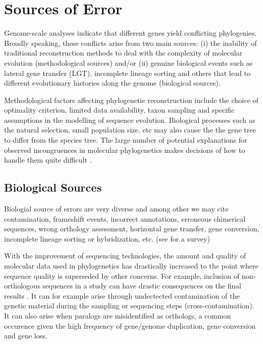 \section{Sources of Error} \label{sec:error-sources}

%
Genome-scale analyses indicate that different genes yield conflicting phylogenies. Broadly speaking, these conflicts arise from two main sources: (i) the inability of traditional reconstruction methods to deal with the complexity of molecular evolution (methodological sources) and/or (ii) genuine biological events such as lateral gene transfer (LGT), incomplete lineage sorting and others that lead to different evolutionary histories along the genome (biological sources).

Methodological factors affecting phylogenetic reconstruction include the choice of optimality criterion, limited data availability, taxon sampling and specific assumptions in the modelling of sequence evolution. Biological processes such as the natural selection, small population size, etc may also cause the the gene tree to differ from the species tree. The large number of potential explanations for observed incongruences in molecular phylogenetics makes decisions of how to handle them quite difficult \citep{rokas2003genome}.

\subsection{Biological Sources} \label{sec:sampling-error}

Biologial source of errors are very diverse and among other we may cite  contamination,  frameshift  events,  incorrect  annotations,  erroneous  chimerical  sequences,  wrong orthology assessment, horizontal gene transfer, gene conversion, incomplete lineage sorting or hybridization, etc. (see \cite{philippe2017pitfalls} for a survey)

With the improvement of sequencing technologies, the amount and quality of molecular data used in phylogenetics has drastically increased to the point where sequence quality is superseded by other concerns. For example, inclusion of non-orthologous sequences in a study can have drastic consequences on the final results \citep{laurin2012origin,philippe2011resolving}. It can for example arise through undectected contamination of the genetic material during the sampling or sequencing steps (cross-contamination). It can also arise when paralogs are misidentified as orthologs, a common occurence given the high frequency of gene/genome duplication, gene conversion and gene loss. 

